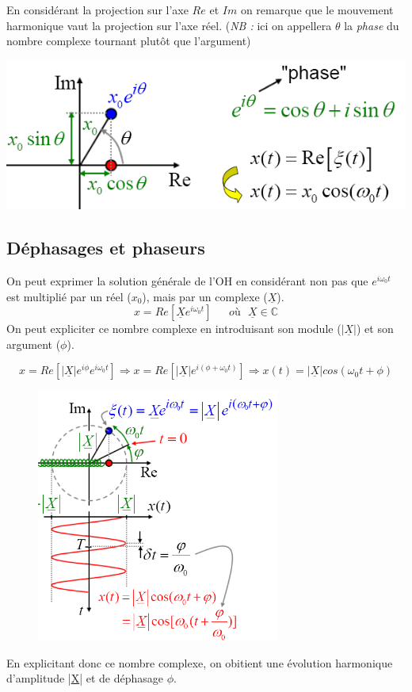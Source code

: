 \documentclass	[11pt, a4paper, openany]{book}
\begin{document}
	En considérant la projection sur l'axe $Re$ et $Im$ on remarque que le mouvement harmonique vaut la projection sur l'axe réel. (\textit{NB :} ici on appellera $\theta$ la \textit{phase} du nombre complexe tournant plutôt que l'argument)
	\begin{center}
		\includegraphics[scale=0.45]{oo/image12.png}
	\end{center}
	
	\subsection{Déphasages et phaseurs}
	On peut exprimer la solution générale de l'OH en considérant non pas que $e^{i\omega_0 t}$ est multiplié par un réel ($x_0$), mais par un complexe ($\underline{X}$).
	\begin{equation}
		x = Re\left[\underline{X}e^{i\omega_0 t}\right]\ \ \ \ \ \ \ où\ \ \ \underline{X} \in \mathbb{C}
	\end{equation}
	On peut expliciter ce nombre complexe en introduisant son module ($|\underline{X}|$) et son argument ($\phi$).
	
	\begin{equation}
		x = Re\left[|\underline{X}|e^{i\phi}e^{i\omega_0t}\right] \Rightarrow x = Re\left[|\underline{X}|e^{i(\phi + \omega_0 t)}\right] \Rightarrow x(t) = |\underline{X}|cos(\omega_0 t + \phi)
	\end{equation}
	
	\begin{figure}
		\includegraphics[width=8cm]{oo/image13.png}
	\end{figure}
	En explicitant donc ce nombre complexe, on obitient une évolution harmonique d'amplitude |\underline{X}| et de déphasage $\phi$.\\
	
\end{document}
